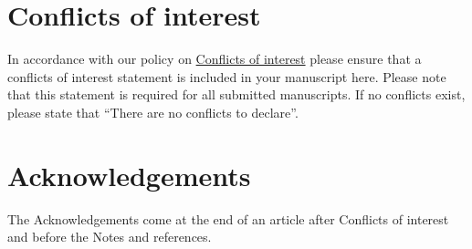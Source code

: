 \documentclass[twoside,twocolumn,9pt]{article}
\renewcommand{\refname}{Notes and references}
\begin{document}
\section*{Conflicts of interest}
In accordance with our policy on \href{http://www.rsc.org/journals-books-databases/journal-authors-reviewers/author-responsibilities/#code-of-conduct}{Conflicts of interest} please ensure that a conflicts of interest statement is included in your manuscript here.  Please note that this statement is required for all submitted manuscripts.  If no conflicts exist, please state that ``There are no conflicts to declare''.

\section*{Acknowledgements}
The Acknowledgements come at the end of an article after Conflicts of interest and before the Notes and references.



\balance


\end{document}
